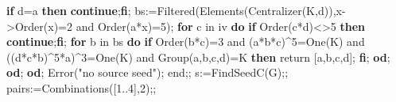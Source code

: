 \documentclass[
  10pt,
  letterpaper,
]{article}
\newenvironment{Shaded}{}{}
\newcommand{\BuiltInTok}[1]{\textcolor[rgb]{0.00,0.50,0.00}{#1}}
\newcommand{\ConstantTok}[1]{\textcolor[rgb]{0.53,0.00,0.00}{#1}}
\newcommand{\ControlFlowTok}[1]{\textcolor[rgb]{0.00,0.44,0.13}{\textbf{#1}}}
\newcommand{\ExtensionTok}[1]{#1}
\newcommand{\FloatTok}[1]{\textcolor[rgb]{0.25,0.63,0.44}{#1}}
\newcommand{\FunctionTok}[1]{\textcolor[rgb]{0.02,0.16,0.49}{#1}}
\newcommand{\NormalTok}[1]{#1}
\newcommand{\OperatorTok}[1]{\textcolor[rgb]{0.40,0.40,0.40}{#1}}
\newcommand{\StringTok}[1]{\textcolor[rgb]{0.25,0.44,0.63}{#1}}
\newcommand{\VariableTok}[1]{\textcolor[rgb]{0.10,0.09,0.49}{#1}}
\begin{document}
\begin{Shaded}
\begin{Highlighting}[]
  \ControlFlowTok{if} \VariableTok{d}\OperatorTok{=}\VariableTok{a} \ControlFlowTok{then} \ControlFlowTok{continue}\OperatorTok{;}\ControlFlowTok{fi}\OperatorTok{;}
  \VariableTok{bs}\OperatorTok{:=}\BuiltInTok{Filtered}\NormalTok{(}\BuiltInTok{Elements}\NormalTok{(}\BuiltInTok{Centralizer}\NormalTok{(}\VariableTok{K}\OperatorTok{,}\VariableTok{d}\NormalTok{))}\OperatorTok{,}\VariableTok{x}\OperatorTok{{-}\textgreater{}}\BuiltInTok{Order}\NormalTok{(}\VariableTok{x}\NormalTok{)}\OperatorTok{=}\FloatTok{2} \ConstantTok{and} \BuiltInTok{Order}\NormalTok{(}\VariableTok{a}\OperatorTok{*}\VariableTok{x}\NormalTok{)}\OperatorTok{=}\FloatTok{5}\NormalTok{)}\OperatorTok{;}
  \ControlFlowTok{for} \VariableTok{c} \ExtensionTok{in} \VariableTok{iv} \ControlFlowTok{do}
   \ControlFlowTok{if} \BuiltInTok{Order}\NormalTok{(}\VariableTok{c}\OperatorTok{*}\VariableTok{d}\NormalTok{)}\OperatorTok{\textless{}\textgreater{}}\FloatTok{5} \ControlFlowTok{then} \ControlFlowTok{continue}\OperatorTok{;}\ControlFlowTok{fi}\OperatorTok{;}
   \ControlFlowTok{for} \VariableTok{b} \ExtensionTok{in} \VariableTok{bs} \ControlFlowTok{do}
    \ControlFlowTok{if} \BuiltInTok{Order}\NormalTok{(}\VariableTok{b}\OperatorTok{*}\VariableTok{c}\NormalTok{)}\OperatorTok{=}\FloatTok{3} \ConstantTok{and}\NormalTok{ (}\VariableTok{a}\OperatorTok{*}\VariableTok{b}\OperatorTok{*}\VariableTok{c}\NormalTok{)}\OperatorTok{\^{}}\FloatTok{5}\OperatorTok{=}\BuiltInTok{One}\NormalTok{(}\VariableTok{K}\NormalTok{)}
      \ConstantTok{and}\NormalTok{ ((}\VariableTok{d}\OperatorTok{*}\VariableTok{c}\OperatorTok{*}\VariableTok{b}\NormalTok{)}\OperatorTok{\^{}}\FloatTok{5}\OperatorTok{*}\VariableTok{a}\NormalTok{)}\OperatorTok{\^{}}\FloatTok{3}\OperatorTok{=}\BuiltInTok{One}\NormalTok{(}\VariableTok{K}\NormalTok{) }\ConstantTok{and} \BuiltInTok{Group}\NormalTok{(}\VariableTok{a}\OperatorTok{,}\VariableTok{b}\OperatorTok{,}\VariableTok{c}\OperatorTok{,}\VariableTok{d}\NormalTok{)}\OperatorTok{=}\VariableTok{K} \ControlFlowTok{then}
     \ExtensionTok{return}\NormalTok{ [}\VariableTok{a}\OperatorTok{,}\VariableTok{b}\OperatorTok{,}\VariableTok{c}\OperatorTok{,}\VariableTok{d}\NormalTok{]}\OperatorTok{;}
    \ControlFlowTok{fi}\OperatorTok{;}
   \ControlFlowTok{od}\OperatorTok{;}
  \ControlFlowTok{od}\OperatorTok{;}
 \ControlFlowTok{od}\OperatorTok{;}
 \BuiltInTok{Error}\NormalTok{(}\StringTok{"no source seed"}\NormalTok{)}\OperatorTok{;}
\FunctionTok{end}\OperatorTok{;;}
\VariableTok{s}\OperatorTok{:=}\VariableTok{FindSeedC}\NormalTok{(}\VariableTok{G}\NormalTok{)}\OperatorTok{;;}
\VariableTok{pairs}\OperatorTok{:=}\BuiltInTok{Combinations}\NormalTok{([}\FloatTok{1}\OperatorTok{..}\FloatTok{4}\NormalTok{]}\OperatorTok{,}\FloatTok{2}\NormalTok{)}\OperatorTok{;;}

\end{Highlighting}
\end{Shaded}
\end{document}
